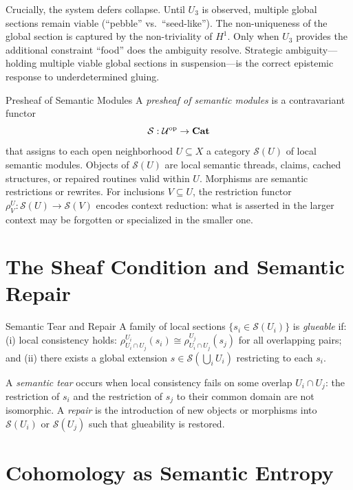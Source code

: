 Crucially, the system defers collapse. Until $U_3$ is observed, multiple global
sections remain viable (``pebble'' vs.\ ``seed-like''). The non-uniqueness of
the global section is captured by the non-triviality of $H^1$. Only when $U_3$
provides the additional constraint ``food'' does the ambiguity resolve. Strategic
ambiguity---holding multiple viable global sections in suspension---is the correct
epistemic response to underdetermined gluing.

\begin{definition}{Presheaf of Semantic Modules}
A \emph{presheaf of semantic modules} is a contravariant functor
\[
  \mathcal{S}: \mathcal{U}^{\rm op} \to \mathbf{Cat}
\]
that assigns to each open neighborhood $U \subseteq X$ a category $\mathcal{S}(U)$
of local semantic modules. Objects of $\mathcal{S}(U)$ are local semantic threads,
claims, cached structures, or repaired routines valid within $U$. Morphisms are
semantic restrictions or rewrites. For inclusions $V \subseteq U$, the restriction
functor $\rho^U_V: \mathcal{S}(U) \to \mathcal{S}(V)$ encodes context reduction:
what is asserted in the larger context may be forgotten or specialized in the
smaller one.
\end{definition}

\section{The Sheaf Condition and Semantic Repair}

\begin{definition}{Semantic Tear and Repair}
A family of local sections $\{s_i \in \mathcal{S}(U_i)\}$ is \emph{glueable} if:
(i) local consistency holds: $\rho^{U_i}_{U_i \cap U_j}(s_i) \cong
\rho^{U_j}_{U_i \cap U_j}(s_j)$ for all overlapping pairs; and (ii) there exists
a global extension $s \in \mathcal{S}(\bigcup_i U_i)$ restricting to each $s_i$.

A \emph{semantic tear} occurs when local consistency fails on some overlap
$U_i \cap U_j$: the restriction of $s_i$ and the restriction of $s_j$ to their
common domain are not isomorphic. A \emph{repair} is the introduction of new objects
or morphisms into $\mathcal{S}(U_i)$ or $\mathcal{S}(U_j)$ such that glueability
is restored.
\end{definition}

\section{Cohomology as Semantic Entropy}

